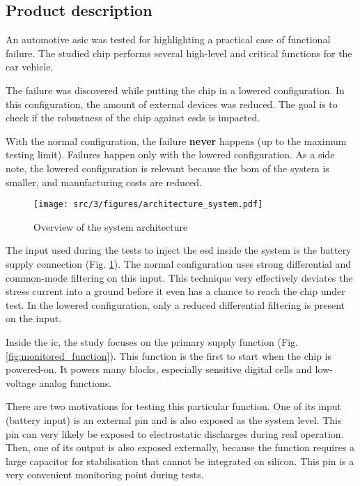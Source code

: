 \subsection{Product description}
\label{sec:product-desc}

An automotive \gls{asic} was tested for highlighting a practical case of functional failure.
The studied chip performs several high-level and critical functions for the car vehicle.

The failure was discovered while putting the chip in a lowered configuration.
In this configuration, the amount of external devices was reduced.
The goal is to check if the robustness of the chip against \gls{esd}s is impacted.

With the normal configuration, the failure \textbf{never} happens (up to the maximum testing limit).
Failures happen only with the lowered configuration.
As a side note, the lowered configuration is relevant because the \gls{bom} of the system is smaller, and manufacturing costs are reduced.

\begin{figure}[!htbp]
  \centering
  \texttt{[image: src/3/figures/architecture\_system.pdf]}
  \caption{Overview of the system architecture}
  \label{fig:system_architecture}
\end{figure}

The input used during the tests to inject the \gls{esd} inside the system is the battery supply connection (Fig. \ref{fig:system_architecture}).
The normal configuration uses strong differential and common-mode filtering on this input.
This technique very effectively deviates the stress current into a ground before it even has a chance to reach the chip under test.
In the lowered configuration, only a reduced differential filtering is present on the input.

Inside the \gls{ic}, the study focuses on the primary supply function (Fig. \ref{fig:monitored_function}).
This function is the first to start when the chip is powered-on.
It powers many blocks, especially sensitive digital cells and low-voltage analog functions.

There are two motivations for testing this particular function.
One of its input (battery input) is an external pin and is also exposed as the system level.
This pin can very likely be exposed to electrostatic discharges during real operation.
Then, one of its output is also exposed externally, because the function requires a large capacitor for stabilisation that cannot be integrated on silicon.
This pin is a very convenient monitoring point during tests.

